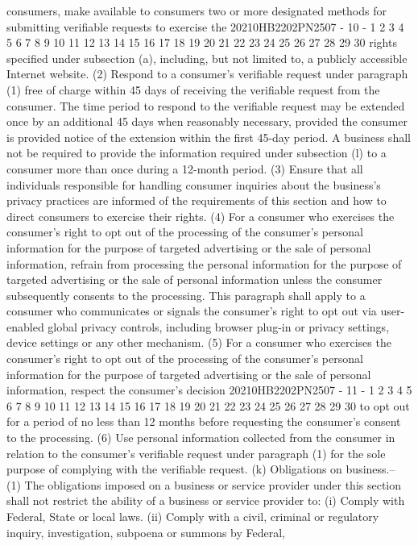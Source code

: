 consumers, make available to consumers two or more designated
methods for submitting verifiable requests to exercise the
20210HB2202PN2507 - 10 -
1
2
3
4
5
6
7
8
9
10
11
12
13
14
15
16
17
18
19
20
21
22
23
24
25
26
27
28
29
30
rights specified under subsection (a), including, but not
limited to, a publicly accessible Internet website.
(2) Respond to a consumer's verifiable request under
paragraph (1) free of charge within 45 days of receiving the
verifiable request from the consumer. The time period to
respond to the verifiable request may be extended once by an
additional 45 days when reasonably necessary, provided the
consumer is provided notice of the extension within the first
45-day period. A business shall not be required to provide
the information required under subsection (l) to a consumer
more than once during a 12-month period.
(3) Ensure that all individuals responsible for handling
consumer inquiries about the business's privacy practices are
informed of the requirements of this section and how to
direct consumers to exercise their rights.
(4) For a consumer who exercises the consumer's right to
opt out of the processing of the consumer's personal
information for the purpose of targeted advertising or the
sale of personal information, refrain from processing the
personal information for the purpose of targeted advertising
or the sale of personal information unless the consumer
subsequently consents to the processing. This paragraph shall
apply to a consumer who communicates or signals the
consumer's right to opt out via user-enabled global privacy
controls, including browser plug-in or privacy settings,
device settings or any other mechanism.
(5) For a consumer who exercises the consumer's right to
opt out of the processing of the consumer's personal
information for the purpose of targeted advertising or the
sale of personal information, respect the consumer's decision
20210HB2202PN2507 - 11 -
1
2
3
4
5
6
7
8
9
10
11
12
13
14
15
16
17
18
19
20
21
22
23
24
25
26
27
28
29
30
to opt out for a period of no less than 12 months before
requesting the consumer's consent to the processing.
(6) Use personal information collected from the consumer
in relation to the consumer's verifiable request under
paragraph (1) for the sole purpose of complying with the
verifiable request.
(k) Obligations on business.--
(1) The obligations imposed on a business or service
provider under this section shall not restrict the ability of
a business or service provider to:
(i) Comply with Federal, State or local laws.
(ii) Comply with a civil, criminal or regulatory
inquiry, investigation, subpoena or summons by Federal,
